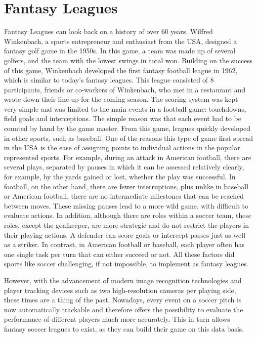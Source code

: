 \section{Fantasy Leagues}

Fantasy Leagues can look back on a history of over 60 years. Wilfred Winkenbach, a sports entrepreneur and enthusiast from the USA, designed a fantasy golf game in the 1950s. In this game, a team was made up of several golfers, and the team with the lowest swings in total won. Building on the success of this game, Winkenbach developed the first fantasy football league in 1962, which is similar to today's fantasy leagues. \parencite[cf.][]{green_wink_2014} This league consisted of 8 participants, friends or co-workers of Winkenbach, who met in a restaurant and wrote down their line-up for the coming season. The scoring system was kept very simple and was limited to the main events in a football game: touchdowns, field goals and interceptions. The simple reason was that each event had to be counted by hand by the game master. \parencite[cf.][]{fabiano_fantasy_2007} From this game, leagues quickly developed in other sports, such as baseball. One of the reasons this type of game first spread in the USA is the ease of assigning points to individual actions in the popular represented sports. For example, during an attack in American football, there are several plays, separated by pauses in which it can be assessed relatively clearly, for example, by the yards gained or lost, whether the play was successful. In football, on the other hand, there are fewer interruptions, plus unlike in baseball or American football, there are no intermediate milestones that can be reached between moves. These missing pauses lead to a more wild game, with difficult to evaluate actions. In addition, although there are roles within a soccer team, these roles, except the goalkeeper, are more strategic and do not restrict the players in their playing actions. A defender can score goals or intercept passes just as well as a striker. In contrast, in American football or baseball, each player often has one single task per turn that can either succeed or not. All these factors did sports like soccer challenging, if not impossible, to implement as fantasy leagues.

However, with the advancement of modern image recognition technologies and player tracking devices such as two high-resolution cameras per playing side, these times are a thing of the past. \parencite[cf.][]{hoffmann_millionen_2014} Nowadays, every event on a soccer pitch is now automatically trackable and therefore offers the possibility to evaluate the performance of different players much more accurately. This in turn allows fantasy soccer leagues to exist, as they can build their game on this data basis.

